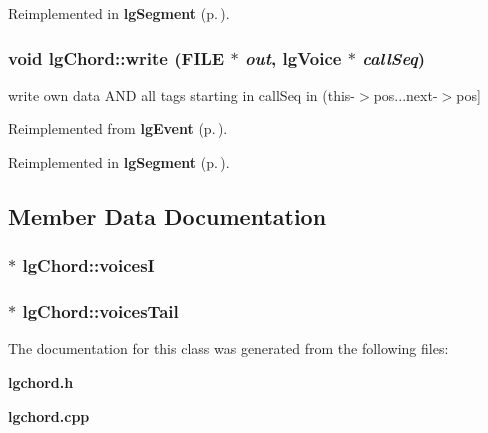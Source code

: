 Reimplemented in {\bf lg\-Segment} {\rm (p.\,\pageref{classlgSegment_a21})}.
\subsubsection{\setlength{\rightskip}{0pt plus 5cm}void lg\-Chord::write (FILE $\ast$ {\em out}, {\bf lg\-Voice} $\ast$ {\em call\-Seq})\hspace{0.3cm}{\tt  [virtual]}}\label{classlgChord_a7}


write own data AND all tags starting in call\-Seq in (this-$>$pos...next-$>$pos] 



Reimplemented from {\bf lg\-Event} {\rm (p.\,\pageref{classlgEvent_a8})}.

Reimplemented in {\bf lg\-Segment} {\rm (p.\,\pageref{classlgSegment_a22})}.

\subsection{Member Data Documentation}
\subsubsection{$\ast$ {\bf lg\-Chord::voices\-I}\hspace{0.3cm}{\tt  [protected]}}\label{classlgChord_p0}


\subsubsection{ $\ast$ {\bf lg\-Chord::voices\-Tail}\hspace{0.3cm}{\tt  [protected]}}\label{classlgChord_p1}




The documentation for this class was generated from the following files:\begin{CompactItemize}
\item 
{\bf lgchord.h}\item 
{\bf lgchord.cpp}\end{CompactItemize}
